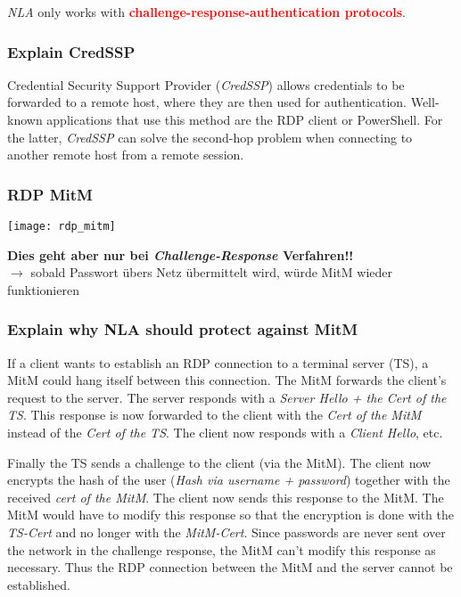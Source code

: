 \textit{NLA} only works with \textcolor{red}{\textbf{challenge-response-authentication protocols}}.

\subsubsection{Explain CredSSP}
Credential Security Support Provider (\textit{CredSSP}) allows credentials to be forwarded to a remote host, where they are then used for authentication. Well-known applications that use this method are the RDP client or PowerShell. For the latter, \textit{CredSSP} can solve the second-hop problem when connecting to another remote host from a remote session.

\subsubsection{RDP MitM}
\begin{center}
    \texttt{[image: rdp\_mitm]}
\end{center}

\textbf{Dies geht aber nur bei \textit{Challenge-Response} Verfahren!!}\\
$\rightarrow$ sobald Passwort übers Netz übermittelt wird, würde MitM wieder funktionieren

\newpage

\subsubsection{Explain why NLA should protect against MitM}
If a client wants to establish an RDP connection to a terminal server (TS), a MitM could hang itself between this connection.
The MitM forwards the client's request to the server. The server responds with a \textit{Server Hello + the Cert of the TS}. This response is now forwarded to the client with the \textit{Cert of the MitM} instead of the \textit{Cert of the TS}. The client now responds with a \textit{Client Hello}, etc.

Finally the TS sends a challenge to the client (via the MitM). The client now encrypts the hash of the user (\textit{Hash via username + password}) together with the received \textit{cert of the MitM}. The client now sends this response to the MitM. The MitM would have to modify this response so that the encryption is done with the \textit{TS-Cert} and no longer with the \textit{MitM-Cert}. Since passwords are never sent over the network in the challenge response, the MitM can't modify this response as necessary.
Thus the RDP connection between the MitM and the server cannot be established.\\

